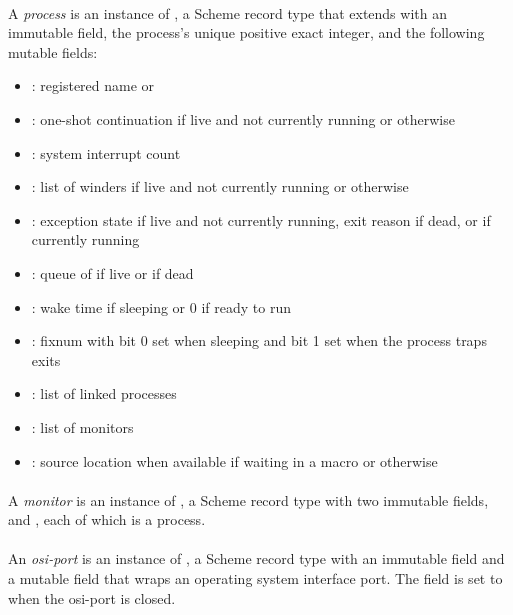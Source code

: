 \paragraph {}
A \emph{process} is an instance of , a Scheme record type
that extends  with an immutable  field, the
process's unique positive exact integer, and the following mutable
fields:
\begin{itemize}
\item {}: registered name or 
\item {}: one-shot continuation if live and not currently
  running or  otherwise
\item {}: system interrupt count
\item {}: list of winders if live and not currently
  running or \code{()} otherwise
\item {}: exception state if live and not
  currently running, exit reason if dead, or  if currently
  running
\item {}: queue of  if live or  if
  dead
\item {}: wake time if sleeping or 0 if ready to run
\item {}: fixnum with bit 0 set when sleeping and bit 1
  set when the process traps exits
\item {}: list of linked processes
\item {}: list of monitors
\item {}: source location  when available if waiting in a 
  macro or  otherwise
\end{itemize}

\paragraph {}
A \emph{monitor} is an instance of , a Scheme record type
with two immutable fields,  and , each
of which is a process.

\paragraph {}
An \emph{osi-port} is an instance of , a Scheme
record type with an immutable  field and a mutable
 field that wraps an operating system interface
port. The  field is set to  when the
osi-port is closed.

